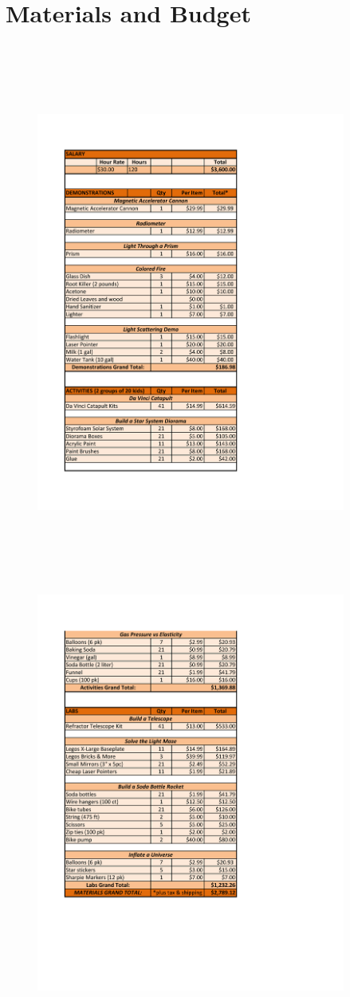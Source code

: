 \section*{Materials and Budget}
\begin{center}
\begin{figure}[h]
\includegraphics[width=4in,height=7in]{budget1.pdf}
\end{figure}
\end{center}

\begin{center}
\begin{figure}[h]
\includegraphics[width=4in]{budget2.pdf}
\end{figure}
\end{center}

